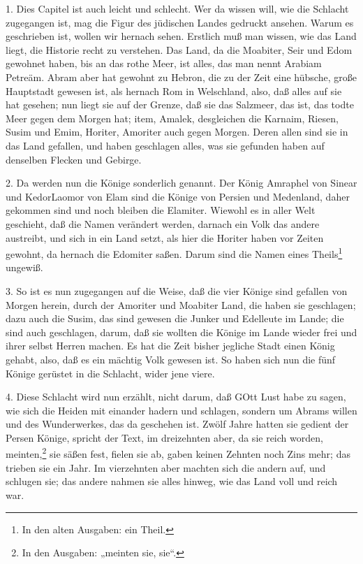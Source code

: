 1. Dies Capitel ist auch leicht und schlecht. Wer da wissen will, wie die Schlacht zugegangen ist, mag die Figur des jüdischen Landes gedruckt ansehen. Warum es geschrieben ist, wollen wir hernach sehen. Erstlich muß man wissen, wie das Land liegt, die Historie recht zu verstehen. Das Land, da die Moabiter, Seir und Edom gewohnet haben, bis an das rothe Meer, ist alles, das man nennt Arabiam Petreäm. Abram
aber hat gewohnt zu Hebron, die zu der Zeit eine hübsche, große Hauptstadt gewesen ist, als hernach Rom in Welschland, also, daß alles auf sie hat gesehen; nun liegt sie auf der Grenze, daß sie das Salzmeer, das ist, das todte Meer gegen dem Morgen hat; item, Amalek, desgleichen die Karnaim, Riesen, Susim und Emim, Horiter, Amoriter auch gegen Morgen. Deren allen sind sie in das Land gefallen, und haben geschlagen alles, was sie gefunden haben auf denselben Flecken und Gebirge.

2. Da werden nun die Könige sonderlich genannt. Der König Amraphel von Sinear und KedorLaomor von Elam sind die Könige von Persien und Medenland, daher gekommen sind und noch bleiben die Elamiter. Wiewohl es in aller Welt geschieht, daß die Namen verändert werden, darnach ein Volk das andere austreibt, und sich in ein Land setzt, als hier die Horiter haben vor Zeiten gewohnt, da hernach die Edomiter saßen. Darum sind die Namen eines Theils\footnote{In den alten Ausgaben: ein Theil.} ungewiß.

3. So ist es nun zugegangen auf die Weise, daß die vier Könige sind gefallen von Morgen herein, durch der Amoriter und Moabiter Land, die haben sie geschlagen; dazu auch die Susim, das sind gewesen die Junker und Edelleute im Lande; die sind auch geschlagen, darum, daß sie wollten die Könige im Lande wieder frei und ihrer selbst Herren machen. Es hat die Zeit bisher jegliche Stadt einen König gehabt, also, daß es ein mächtig Volk gewesen ist. So haben sich nun die fünf Könige gerüstet in die Schlacht, wider jene viere.

4. Diese Schlacht wird nun erzählt, nicht darum, daß GOtt Lust habe zu sagen, wie sich die Heiden mit einander hadern und schlagen, sondern um Abrams willen und des Wunderwerkes, das da geschehen ist. Zwölf Jahre hatten sie gedient der Persen Könige, spricht der Text, im dreizehnten aber, da sie reich worden, meinten,\footnote{In den Ausgaben: „meinten sie, sie“.} sie säßen fest, fielen sie ab, gaben keinen Zehnten noch Zins mehr; das trieben sie ein Jahr. Im vierzehnten aber machten sich die andern auf, und schlugen sie; das andere nahmen sie alles hinweg, wie das Land voll und reich war.

